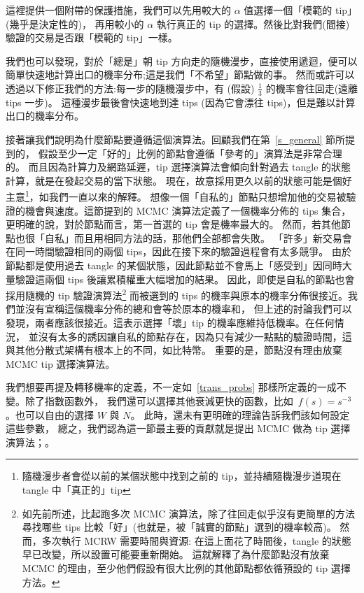 \documentclass[12pt]{article}
\begin{document}
\begin{CJK}{UTF8}{bkai}
這裡提供一個附帶的保護措施，我們可以先用較大的 $\alpha$ 值選擇一個「模範的 tip」(幾乎是決定性的)，
再用較小的 $\alpha$ 執行真正的 tip 的選擇。然後比對我們(間接)驗證的交易是否跟「模範的 tip」一樣。

我們也可以發現，對於「總是」朝 tip 方向走的隨機漫步，直接使用遞迴，便可以簡單快速地計算出口的機率分布;這是我們「不希望」節點做的事。
然而或許可以透過以下修正我們的方法:每一步的隨機漫步中，有 (假設) $\frac{1}{3}$ 的機率會往回走(遠離 tips 一步)。
這種漫步最後會快速地到達 tips (因為它會漂往 tips)，但是難以計算出口的機率分布。

接著讓我們說明為什麼節點要遵循這個演算法。回顧我們在第~\ref{s_general} 節所提到的，
假設至少一定「好的」比例的節點會遵循「參考的」演算法是非常合理的。
而且因為計算力及網路延遲，tip 選擇演算法會傾向針對過去 tangle 的狀態計算，就是在發起交易的當下狀態。
現在，故意採用更久以前的狀態可能是個好主意\footnote{
隨機漫步者會從以前的某個狀態中找到之前的 tip，並持續隨機漫步道現在 tangle 中「真正的」tip}，如我們一直以來的解釋。
想像一個「自私的」節點只想增加他的交易被驗證的機會與速度。這節提到的 MCMC 演算法定義了一個機率分佈的 tips 集合，
更明確的說，對於節點而言，第一首選的 tip 會是機率最大的。
然而，若其他節點也很「自私」而且用相同方法的話，那他們全部都會失敗。
「許多」新交易會在同一時間驗證相同的兩個 tips，因此在接下來的驗證過程會有太多競爭。
由於節點都是使用過去 tangle 的某個狀態，因此節點並不會馬上「感受到」因同時大量驗證這兩個 tips 後讓累積權重大幅增加的結果。
因此，即使是自私的節點也會採用隨機的 tip 驗證演算法\footnote{
如先前所述，比起跑多次 MCMC 演算法，除了往回走似乎沒有更簡單的方法尋找哪些 tips 比較「好」(也就是，被「誠實的節點」選到的機率較高)。
然而，多次執行 MCRW 需要時間與資源: 在這上面花了時間後，tangle 的狀態早已改變，所以設置可能要重新開始。
這就解釋了為什麼節點沒有放棄 MCMC 的理由，至少他們假設有很大比例的其他節點都依循預設的 tip 選擇方法。}
而被選到的 tips 的機率與原本的機率分佈很接近。我們並沒有宣稱這個機率分佈的總和會等於原本的機率和，
但上述的討論我們可以發現，兩者應該很接近。這表示選擇「壞」tip 的機率應維持低機率。在任何情況，
並沒有太多的誘因讓自私的節點存在，因為只有減少一點點的驗證時間，這與其他分散式架構有根本上的不同，如比特幣。
重要的是，節點沒有理由放棄 MCMC tip 選擇演算法。

我們想要再提及轉移機率的定義，不一定如~\eqref{trans_probs} 那樣所定義的一成不變。除了指數函數外，
我們還可以選擇其他衰減更快的函數，比如~$f(s)=s^{-3}$。也可以自由的選擇 $W$ 與 $N$。
此時，還未有更明確的理論告訴我們該如何設定這些參數，
總之，我們認為這一節最主要的貢獻就是提出 MCMC 做為 tip 選擇演算法；。



\end{CJK}
\end{document}
